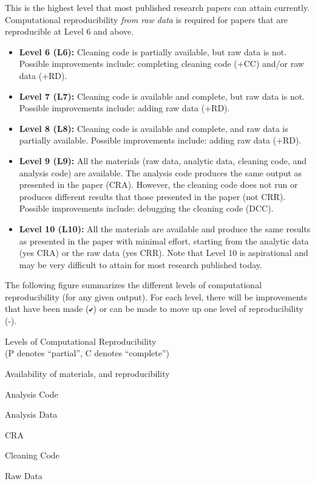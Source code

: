 \documentclass[]{book}
\begin{document}
This is the highest level that most published research papers can attain currently. Computational reproducibility \emph{from raw data} is required for papers that are reproducible at Level 6 and above.

\begin{itemize}
\item
  \textbf{Level 6 (L6):} Cleaning code is partially available, but raw data is not. Possible improvements include: completing cleaning code (+CC) and/or raw data (+RD).
\item
  \textbf{Level 7 (L7):} Cleaning code is available and complete, but raw data is not. Possible improvements include: adding raw data (+RD).
\item
  \textbf{Level 8 (L8):} Cleaning code is available and complete, and raw data is partially available. Possible improvements include: adding raw data (+RD).
\item
  \textbf{Level 9 (L9):} All the materials (raw data, analytic data, cleaning code, and analysis code) are available. The analysis code produces the same output as presented in the paper (CRA). However, the cleaning code does not run or produces different results that those presented in the paper (not CRR). Possible improvements include: debugging the cleaning code (DCC).
\item
  \textbf{Level 10 (L10):} All the materials are available and produce the same results as presented in the paper with minimal effort, starting from the analytic data (yes CRA) or the raw data (yes CRR). Note that Level 10 is aspirational and may be very difficult to attain for most research published today.
\end{itemize}

The following figure summarizes the different levels of computational reproducibility (for any given output). For each level, there will be improvements that have been made (\texttt{✔}) or can be made to move up one level of reproducibility (-).

\label{tab:levels-of-computational-reproducibility}Levels of Computational Reproducibility\\
(P denotes ``partial'', C denotes ``complete'')

Availability of materials, and reproducibility

Analysis Code

Analysis Data

CRA

Cleaning Code

Raw Data
\end{document}
